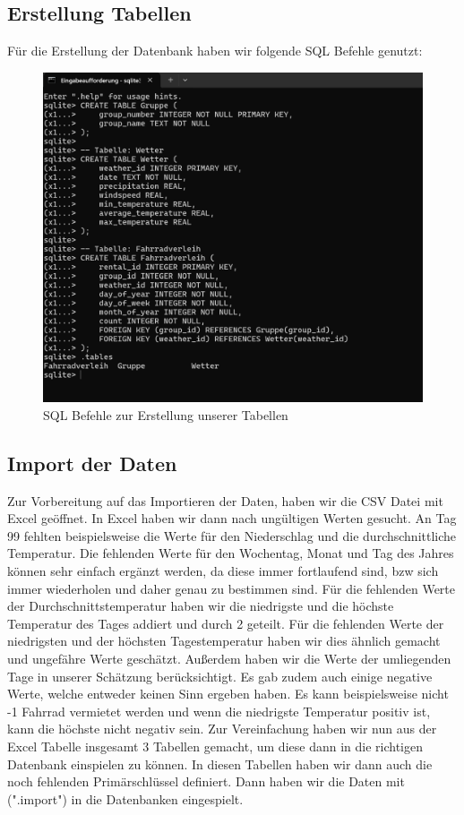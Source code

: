 \documentclass[a4paper,11pt]{article}
\begin{document}
 
\subsection{Erstellung Tabellen}
Für die Erstellung der Datenbank haben wir folgende SQL Befehle genutzt: 


\begin{figure}[h]
\centering
\includegraphics[scale=.5]{Tabellen erstellen.png}
\caption{SQL Befehle zur Erstellung unserer Tabellen}
\label{fig:meine-grafik2}
\end{figure}

\subsection{Import der Daten}
Zur Vorbereitung auf das Importieren der Daten, haben wir die CSV Datei mit Excel geöffnet. In Excel haben wir dann nach ungültigen Werten gesucht. An Tag 99 fehlten beispielsweise die Werte für den Niederschlag und die durchschnittliche Temperatur. Die fehlenden Werte für den Wochentag, Monat und Tag des Jahres können sehr einfach ergänzt werden, da diese immer fortlaufend sind, bzw sich immer wiederholen und daher genau zu bestimmen sind. Für die fehlenden Werte der Durchschnittstemperatur haben wir die niedrigste und die höchste Temperatur des Tages addiert und durch 2 geteilt. Für die fehlenden Werte der niedrigsten und der höchsten Tagestemperatur haben wir dies ähnlich gemacht und ungefähre Werte geschätzt. Außerdem haben wir die Werte der umliegenden Tage in unserer Schätzung berücksichtigt. Es gab zudem auch einige negative Werte, welche entweder keinen Sinn ergeben haben. Es kann beispielsweise nicht -1 Fahrrad vermietet werden und wenn die niedrigste Temperatur positiv ist, kann die höchste nicht negativ sein.
Zur Vereinfachung haben wir nun aus der Excel Tabelle insgesamt 3 Tabellen gemacht, um diese dann in die richtigen Datenbank einspielen zu können. In diesen Tabellen haben wir dann auch die noch fehlenden Primärschlüssel definiert. 
Dann haben wir die Daten mit (".import") in die Datenbanken eingespielt. 
\end{document}
